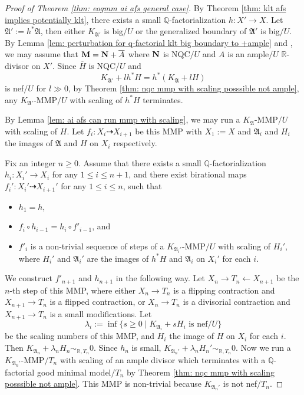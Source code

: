 \documentclass[12pt]{amsart}
\numberwithin{equation}{section}
\newcommand{\Mm}{{\bf{M}}}
\newcommand{\Nn}{{\bf{N}}}
\newcommand{\Rr}{\mathbb{R}}
\newcommand{\Aa}{{\mathfrak{A}}}
\theoremstyle{definition}
\theoremstyle{definition}
\theoremstyle{definition}
\begin{document}
\begin{proof}[Proof of Theorem \ref{thm: eogmm ai afs general case}]
By Theorem \ref{thm: klt afs implies potentially klt}, there exists a small $\mathbb Q$-factorialization $h: X'\rightarrow X$. Let $\Aa':=h^*\Aa$, then either $K_{\Aa'}$ is big$/U$ or the generalized boundary of $\Aa'$ is big$/U$. By Lemma \ref{lem: perturbation for q-factorial klt big boundary to +ample} and \cite[Lemma 6.6]{CHLMSSX24}, we may assume that $\Mm=\Nn+\overline{A}$ where $\Nn$ is NQC$/U$ and $A$ is an ample$/U$ $\Rr$-divisor on $X'$.  Since $\overline{H}$ is NQC$/U$ and 
$$K_{\Aa'}+lh^*H=h^*(K_{\Aa}+lH)$$ 
is nef$/U$ for $l\gg 0$, by Theorem \ref{thm: nqc mmp with scaling posssible not ample}, any $K_{\Aa'}$-MMP$/U$ with scaling of $h^*H$ terminates.

By Lemma \ref{lem: ai afs can run mmp with scaling}, we may run a $K_{\Aa}$-MMP$/U$ with scaling of $H$. Let $f_i: X_i\dashrightarrow X_{i+1}$ be this MMP with $X_1:=X$ and $\Aa_i$ and $H_i$ the images of $\Aa$ and $H$ on $X_i$ respectively.

Fix an integer $n\geq 0$. Assume that there exists a small  $\mathbb Q$-factorialization $h_i: X_i'\rightarrow X_i$ for any $1\leq i\leq n+1$, and there exist birational maps $f_i': X_i'\dashrightarrow X_{i+1}'$  for any $1\leq i\leq n$, such that
\begin{itemize}
    \item $h_1=h$,
    \item $f_i\circ h_{i-1}=h_i\circ f'_{i-1}$, and
    \item $f'_i$ is a non-trivial sequence of steps of a $K_{\Aa_i'}$-MMP$/U$ with scaling of $H_i'$, where $H_i'$ and $\Aa_i'$ are the images of $h^*H$ and $\Aa_i$ on $X_i'$ for each $i$.
\end{itemize}
We construct $f'_{n+1}$ and $h_{n+1}$ in the following way. Let $X_n\rightarrow T_n\leftarrow X_{n+1}$ be the $n$-th step of this MMP, where either $X_n\rightarrow T_n$ is a flipping contraction and $X_{n+1}\rightarrow T_n$ is a flipped contraction, or $X_n\rightarrow T_n$ is a divisorial contraction and  $X_{n+1}\rightarrow T_n$ is a small modifications. Let 
$$\lambda_i:=\inf\{s\geq 0\mid K_{\Aa_i}+sH_i\text{ is nef}/U\}$$
be the scaling numbers of this MMP, and $H_i$ the image of $H$ on $X_i$ for each $i$. Then $K_{\Aa_n}+\lambda_nH_n\sim_{\mathbb R,T_n}0$. Since $h_n$ is small, $K_{\Aa_n'}+\lambda_nH_n'\sim_{\mathbb R,T_n}0$. Now we run a $K_{\Aa_n'}$-MMP$/T_n$ with scaling of an ample divisor which terminates with a $\mathbb Q$-factorial good minimal model$/T_n$ by Theorem \ref{thm: nqc mmp with scaling posssible not ample}. This MMP is non-trivial because $K_{\Aa_n'}$ is not nef$/T_n$.


\end{proof}
\end{document}
